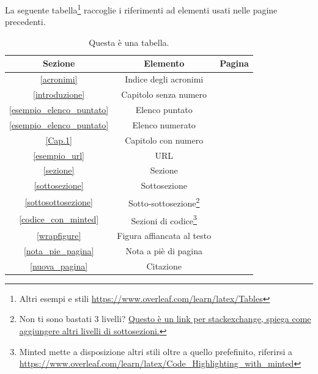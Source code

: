\documentclass[envcountsame,envcountchap]{svmono}
\begin{document}
\vspace{0.5cm}

La seguente tabella\footnote{Altri esempi e stili \url{https://www.overleaf.com/learn/latex/Tables}} raccoglie i riferimenti ad elementi usati nelle pagine precedenti.

\begin{table}[h!]
    \centering
    \begin{tabular}{||c | c | c||} 
        \hline
        Sezione & Elemento & Pagina \\ [0.5ex] 
        \hline\hline
        \ref{acronimi} & Indice degli acronimi & \pageref{acronimi} \\ 
        \ref{introduzione} & Capitolo senza numero & \pageref{introduzione} \\
        \ref{esempio_elenco_puntato} & Elenco puntato & \pageref{esempio_elenco_puntato} \\
        \ref{esempio_elenco_puntato} & Elenco numerato & \pageref{esempio_elenco_puntato} \\
        \ref{Cap.1} & Capitolo con numero & \pageref{Cap.1} \\
        \ref{esempio_url} & URL & \pageref{esempio_url} \\
        \ref{sezione} & Sezione & \pageref{sezione} \\
        \ref{sottosezione} & Sottosezione & \pageref{sottosezione} \\
        \ref{sottosottosezione} & Sotto-sottosezione\footnote{Non ti sono bastati 3 livelli? \href{https://tex.stackexchange.com/questions/60209/how-to-add-an-extra-level-of-sections-with-headings-below-subsubsection}{Questo è un link per stackexchange, spiega come aggiungere altri livelli di sottosezioni.}} & \pageref{sottosottosezione} \\
        \ref{codice_con_minted} & Sezioni di codice\footnote{Minted mette a disposizione altri stili oltre a quello prefefinito, riferirsi a \url{https://www.overleaf.com/learn/latex/Code_Highlighting_with_minted}} & \pageref{codice_con_minted} \\
        \ref{wrapfigure} & Figura affiancata al testo & \pageref{wrapfigure} \\
        \ref{nota_pie_pagina} & Nota a piè di pagina & \pageref{nota_pie_pagina} \\
        \ref{nuova_pagina} & Citazione & \pageref{nuova_pagina} \\ [1ex] 
        \hline
    \end{tabular}
    \caption{Questa è una tabella.}
    \label{tabella_esempi}
\end{table}
\end{document}
